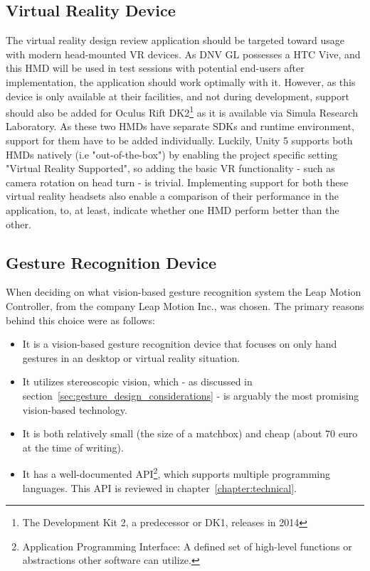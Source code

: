 \subsection{Virtual Reality Device}
The virtual reality design review application should be targeted toward usage with modern head-mounted VR devices.
As DNV GL possesses a HTC Vive, and this HMD will be used in test sessions with potential end-users after implementation, 
the application should work optimally with it. However, as this device is only available at their facilities, and not during development, support 
should also be added for Oculus Rift DK2\footnote{The Development Kit 2, a predecessor or DK1, releases in 2014} as it is available via Simula Research Laboratory.
As these two HMDs have separate SDKs and runtime environment, support for them have to be added individually. 
Luckily, Unity 5 supports both HMDs natively (i.e "out-of-the-box") by enabling the project specific setting "Virtual Reality Supported", 
so adding the basic VR functionality - such as camera rotation on head turn - is trivial. 
Implementing support for both these virtual reality headsets also enable a comparison of their performance in the application, to, at least, indicate whether 
one HMD perform better than the other. 

\subsection{Gesture Recognition Device}
When deciding on what vision-based gesture recognition system the Leap Motion Controller, from the company Leap Motion Inc., was chosen.
The primary reasons behind this choice were as follows: 
\begin{itemize}
    \item It is a vision-based gesture recognition device that focuses on only hand gestures in an desktop or virtual reality situation.
    \item It utilizes stereoscopic vision, which - as discussed in section~\vref{sec:gesture_design_considerations} - is arguably the most promising vision-based technology.
    \item It is both relatively small (the size of a matchbox) and cheap (about 70 euro at the time of writing). 
    \item It has a well-documented API\footnote{Application Programming Interface: A defined set of high-level functions or abstractions other software can utilize.}, which 
          supports multiple programming languages. This API is reviewed in chapter~\vref{chapter:technical}.
\end{itemize}

